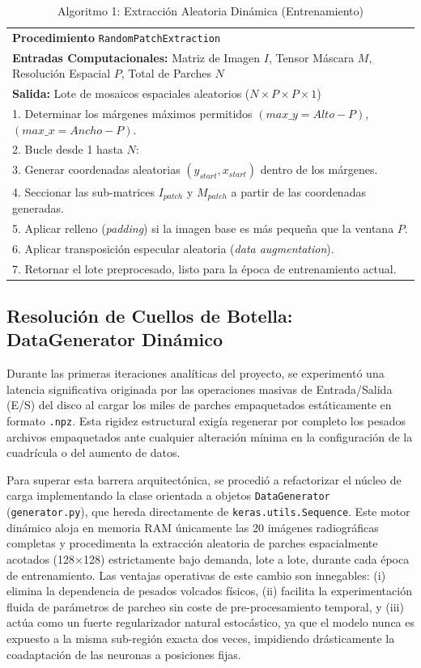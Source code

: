 \documentclass[conference]{IEEEtran}
\begin{document}
\begin{table}[htbp]
\centering
\caption{Algoritmo 1: Extracción Aleatoria Dinámica (Entrenamiento)}
\label{tab:pseudocode1}
\begin{tabular}{|p{8cm}|}
\hline
\textbf{Procedimiento} \texttt{RandomPatchExtraction} \\
\textbf{Entradas Computacionales:} Matriz de Imagen $I$, Tensor Máscara $M$, Resolución Espacial $P$, Total de Parches $N$ \\
\textbf{Salida:} Lote de mosaicos espaciales aleatorios ($N \times P \times P \times 1$) \\
1. Determinar los márgenes máximos permitidos $(max\_y = Alto - P)$, $(max\_x = Ancho - P)$. \\
2. Bucle desde 1 hasta $N$: \\
3. \quad Generar coordenadas aleatorias $(y_{start}, x_{start})$ dentro de los márgenes. \\
4. \quad Seccionar las sub-matrices $I_{patch}$ y $M_{patch}$ a partir de las coordenadas generadas. \\
5. \quad Aplicar relleno (\textit{padding}) si la imagen base es más pequeña que la ventana $P$. \\
6. \quad Aplicar transposición especular aleatoria (\textit{data augmentation}). \\
7. Retornar el lote preprocesado, listo para la época de entrenamiento actual. \\
\hline
\end{tabular}
\end{table}

\subsection{Resolución de Cuellos de Botella: DataGenerator Dinámico}
Durante las primeras iteraciones analíticas del proyecto, se experimentó una latencia significativa originada por las operaciones masivas de Entrada/Salida (E/S) del disco al cargar los miles de parches empaquetados estáticamente en formato \texttt{.npz}. Esta rigidez estructural exigía regenerar por completo los pesados archivos empaquetados ante cualquier alteración mínima en la configuración de la cuadrícula o del aumento de datos.

Para superar esta barrera arquitectónica, se procedió a refactorizar el núcleo de carga implementando la clase orientada a objetos \texttt{DataGenerator} (\texttt{generator.py}), que hereda directamente de \texttt{keras.utils.Sequence}. Este motor dinámico aloja en memoria RAM únicamente las 20 imágenes radiográficas completas y procedimenta la extracción aleatoria de parches espacialmente acotados (128$\times$128) estrictamente bajo demanda, lote a lote, durante cada época de entrenamiento. Las ventajas operativas de este cambio son innegables: (i) elimina la dependencia de pesados volcados físicos, (ii) facilita la experimentación fluida de parámetros de parcheo sin coste de pre-procesamiento temporal, y (iii) actúa como un fuerte regularizador natural estocástico, ya que el modelo nunca es expuesto a la misma sub-región exacta dos veces, impidiendo drásticamente la coadaptación de las neuronas a posiciones fijas.
\end{document}
